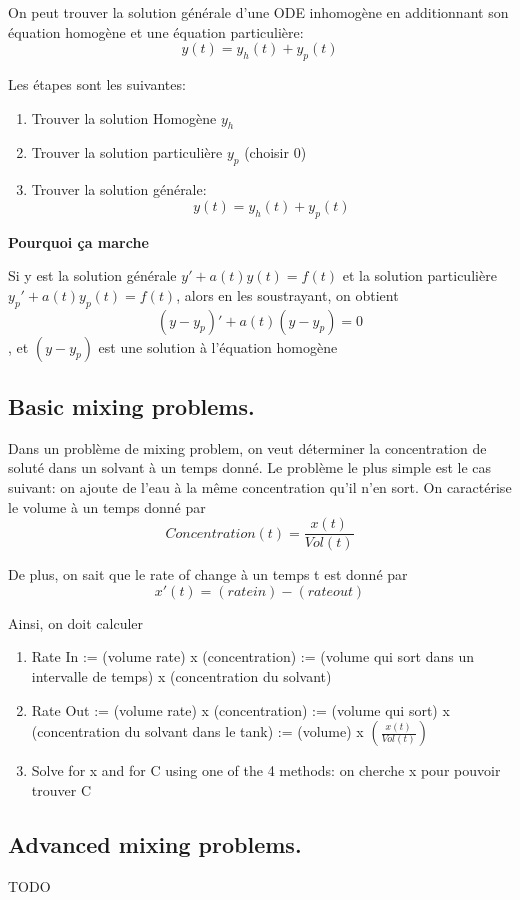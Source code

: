 \documentclass{article}
\begin{document}
On peut trouver la solution générale d'une ODE inhomogène en additionnant
son équation homogène et une équation particulière:
$$ y(t) = y_h (t) + y_p (t) $$

Les étapes sont les suivantes:
\begin{enumerate}
    \item Trouver la solution Homogène $y_h$
    \item Trouver la solution particulière $y_p$ (choisir 0)
    \item Trouver la solution générale: $$ y(t) = y_h (t) + y_p (t) $$
\end{enumerate}

\textbf{Pourquoi ça marche}

Si y est la solution générale $y'+a(t)y(t) = f(t)$ et la solution particulière
$y_p'+a(t)y_p(t) = f(t)$, alors en les soustrayant, on obtient
$$ (y-y_p)' +a(t) (y-y_p) = 0$$, et $ (y - y_p) $ est une solution à
l'équation homogène

\subsection{Basic mixing problems.}

Dans un problème de mixing problem, on veut déterminer la concentration
de soluté dans un solvant à un temps donné. Le problème le plus simple
est le cas suivant: on ajoute de l'eau à la même concentration qu'il
n'en sort. On caractérise le volume à un temps donné par
$$ Concentration(t) = \frac{x(t)}{Vol(t)} $$

De plus, on sait que le rate of change à un temps t est donné par
$$ x'(t) = (rate in) - (rate out) $$

Ainsi, on doit calculer
\begin{enumerate}
    \item Rate In := (volume rate) x (concentration) := (volume qui sort
	dans un intervalle de temps) x (concentration du solvant)
    \item Rate Out := (volume rate) x (concentration) :=
	(volume qui sort) x (concentration du solvant dans le tank) :=
	(volume) x $(\frac{x(t)}{Vol(t)} )$
    \item Solve for x and for C using one of the 4 methods: on cherche
	x pour pouvoir trouver C
\end{enumerate}

\subsection{Advanced mixing problems.}
TODO
\end{document}
